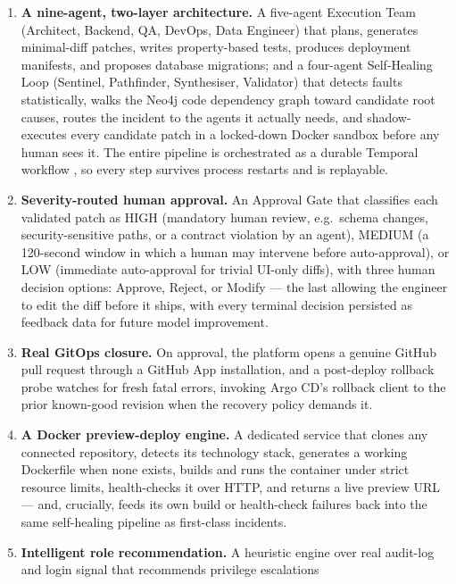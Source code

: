 \begin{enumerate}
  \item \textbf{A nine-agent, two-layer architecture.} A five-agent Execution
    Team (Architect, Backend, QA, DevOps, Data Engineer) that plans,
    generates minimal-diff patches, writes property-based tests, produces
    deployment manifests, and proposes database migrations; and a four-agent
    Self-Healing Loop (Sentinel, Pathfinder, Synthesiser, Validator) that
    detects faults statistically, walks the Neo4j \cite{neo4j} code
    dependency graph toward candidate root causes, routes the incident to
    the agents it actually needs, and shadow-executes every candidate patch
    in a locked-down Docker \cite{docker} sandbox before any human sees it.
    The entire pipeline is orchestrated as a durable Temporal workflow
    \cite{temporal}, so every step survives process restarts and is
    replayable.
  \item \textbf{Severity-routed human approval.} An Approval Gate that
    classifies each validated patch as HIGH (mandatory human review, e.g.\
    schema changes, security-sensitive paths, or a contract violation by an
    agent), MEDIUM (a 120-second window in which a human may intervene
    before auto-approval), or LOW (immediate auto-approval for trivial
    UI-only diffs), with three human decision options: Approve, Reject, or
    Modify --- the last allowing the engineer to edit the diff before it
    ships, with every terminal decision persisted as feedback data for
    future model improvement.
  \item \textbf{Real GitOps closure.} On approval, the platform opens a
    genuine GitHub pull request through a GitHub App installation, and a
    post-deploy rollback probe watches for fresh fatal errors, invoking
    Argo CD's rollback client \cite{argocd} to the prior known-good revision
    when the recovery policy demands it.
  \item \textbf{A Docker preview-deploy engine.} A dedicated service that
    clones any connected repository, detects its technology stack, generates
    a working Dockerfile when none exists, builds and runs the container
    under strict resource limits, health-checks it over HTTP, and returns a
    live preview URL --- and, crucially, feeds its own build or health-check
    failures back into the same self-healing pipeline as first-class
    incidents.
  \item \textbf{Intelligent role recommendation.} A heuristic engine over
    real audit-log and login signal that recommends privilege escalations

\end{enumerate}
